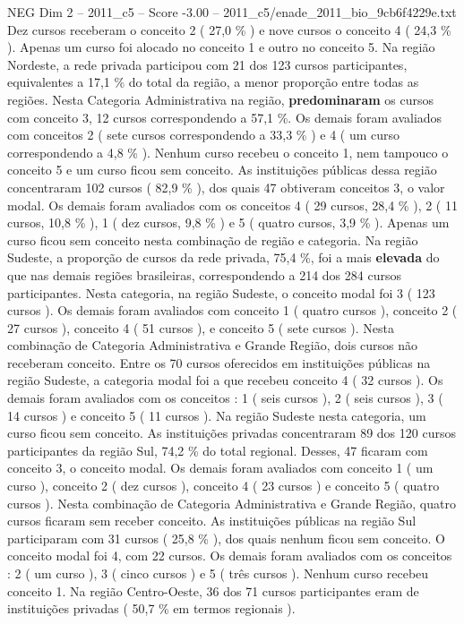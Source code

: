 \begin{textsample}{NEG Dim 2 – 2011\_c5 – Score -3.00 – 2011\_c5/enade\_2011\_bio\_9cb6f4229e.txt}
Dez cursos receberam o conceito 2 ( 27,0 \% ) e nove cursos o conceito 4 ( 24,3 \% ).
Apenas um curso foi alocado no conceito 1 e outro no conceito 5.
Na região Nordeste, a rede privada participou com 21 dos 123 cursos participantes, equivalentes a 17,1 \% do total da região, a menor proporção entre todas as regiões.
Nesta Categoria Administrativa na região, \textbf{predominaram} os cursos com conceito 3, 12 cursos correspondendo a 57,1 \%.
Os demais foram avaliados com conceitos 2 ( sete cursos correspondendo a 33,3 \% ) e 4 ( um curso correspondendo a 4,8 \% ).
Nenhum curso recebeu o conceito 1, nem tampouco o conceito 5 e um curso ficou sem conceito.
As instituições públicas dessa região concentraram 102 cursos ( 82,9 \% ), dos quais 47 obtiveram conceitos 3, o valor modal.
Os demais foram avaliados com os conceitos 4 ( 29 cursos, 28,4 \% ), 2 ( 11 cursos, 10,8 \% ), 1 ( dez cursos, 9,8 \% ) e 5 ( quatro cursos, 3,9 \% ).
Apenas um curso ficou sem conceito nesta combinação de região e categoria.
Na região Sudeste, a proporção de cursos da rede privada, 75,4 \%, foi a mais \textbf{elevada} do que nas demais regiões brasileiras, correspondendo a 214 dos 284 cursos participantes.
Nesta categoria, na região Sudeste, o conceito modal foi 3 ( 123 cursos ).
Os demais foram avaliados com conceito 1 ( quatro cursos ), conceito 2 ( 27 cursos ), conceito 4 ( 51 cursos ), e conceito 5 ( sete cursos ).
Nesta combinação de Categoria Administrativa e Grande Região, dois cursos não receberam conceito.
Entre os 70 cursos oferecidos em instituições públicas na região Sudeste, a categoria modal foi a que recebeu conceito 4 ( 32 cursos ).
Os demais foram avaliados com os conceitos : 1 ( seis cursos ), 2 ( seis cursos ), 3 ( 14 cursos ) e conceito 5 ( 11 cursos ).
Na região Sudeste nesta categoria, um curso ficou sem conceito.
As instituições privadas concentraram 89 dos 120 cursos participantes da região Sul, 74,2 \% do total regional.
Desses, 47 ficaram com conceito 3, o conceito modal.
Os demais foram avaliados com conceito 1 ( um curso ), conceito 2 ( dez cursos ), conceito 4 ( 23 cursos ) e conceito 5 ( quatro cursos ).
Nesta combinação de Categoria Administrativa e Grande Região, quatro cursos ficaram sem receber conceito.
As instituições públicas na região Sul participaram com 31 cursos ( 25,8 \% ), dos quais nenhum ficou sem conceito.
O conceito modal foi 4, com 22 cursos.
Os demais foram avaliados com os conceitos : 2 ( um curso ), 3 ( cinco cursos ) e 5 ( três cursos ).
Nenhum curso recebeu conceito 1.
Na região Centro-Oeste, 36 dos 71 cursos participantes eram de instituições privadas ( 50,7 \% em termos regionais ).

\end{textsample}
